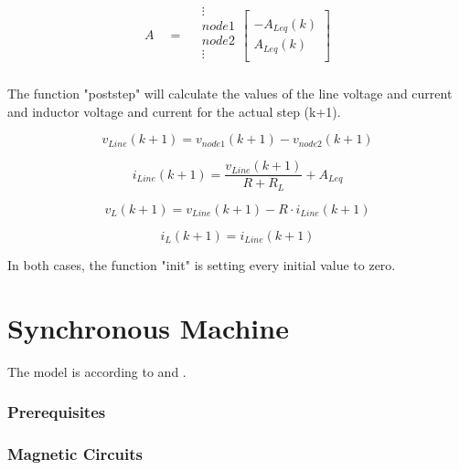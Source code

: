 \begin{align} \label{eq:AleqStamp}
\begin{split}
A\quad = \quad
\begin{matrix}
\vdots\\[8pt]
node1\\[8pt]
node2\\[8pt]
\vdots\\
\end{matrix}
\begin{bmatrix}
	\quad \\[8pt]
	-A_{Leq}(k) \\[8pt]
	A_{Leq}(k) \\[8pt]
	\quad
\end{bmatrix}
\end{split}
\end{align}

The function "poststep" will calculate the values of the line voltage and current and inductor voltage and current for the actual step (k+1).

\begin{equation}
	v_{Line}(k+1) = v_{node1}(k+1) - v_{node2}(k+1) 
\end{equation}

\begin{equation}
	i_{Line}(k+1) = \frac{v_{Line}(k+1)}{R+R_L} + A_{Leq} 
\end{equation}

\begin{equation}
	v_L(k+1) = v_{Line}(k+1) - R \cdot i_{Line}(k+1)
\end{equation}

\begin{equation}
	i_L(k+1) = i_{Line}(k+1)
\end{equation}

In both cases, the function "init" is setting every initial value to zero.
 
\section{Synchronous Machine}

The model is according to \cite{wang2010methods} and \cite{kundur1994power}. 

\subsubsection{Prerequisites}


\subsubsection{Magnetic Circuits}

